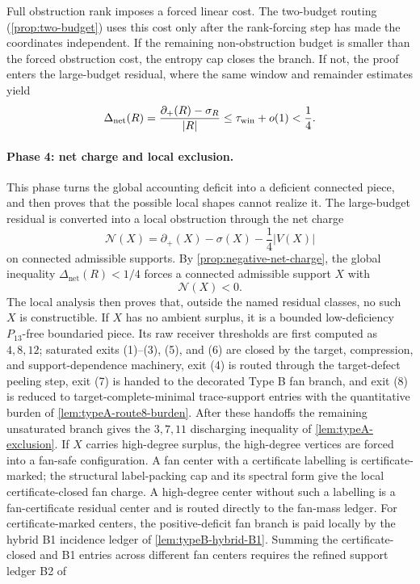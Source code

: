 \documentclass[11pt]{article}
\newcommand{\defp}{\partial_+}
\newcommand{\No}{\mathcal N}
\begin{document}
Full obstruction rank imposes a forced linear cost.  The two-budget routing
(\cref{prop:two-budget}) uses this cost only after the rank-forcing step has
made the coordinates independent.  If the remaining non-obstruction budget is
smaller than the forced obstruction cost, the entropy cap closes the branch.  If
not, the proof enters the large-budget residual, where the same window and
remainder estimates yield
\[
\Delta_{\mathrm{net}}(R)
=\frac{\defp(R)-\sigma_R}{|R|}
\le \tau_{\rm win}+o(1)<\frac14 .
\]

\paragraph{Phase 4: net charge and local exclusion.}
This phase turns the global accounting deficit into a deficient connected
piece, and then proves that the possible local shapes cannot realize it.
The large-budget residual is converted into a local obstruction through the net
charge
\[
\No(X)=\defp(X)-\sigma(X)-\frac14|V(X)|
\]
on connected admissible supports.  By
\cref{prop:negative-net-charge}, the global inequality
$\Delta_{\mathrm{net}}(R)<1/4$ forces a connected admissible support $X$ with
\[
\No(X)<0 .
\]
The local analysis then proves that, outside the named residual classes, no
such $X$ is constructible.  If $X$ has no ambient surplus, it is a bounded
low-deficiency $P_{13}$-free boundaried piece.  Its raw receiver thresholds are first
computed as $4,8,12$; saturated exits (1)--(3), (5), and (6) are closed by the
target, compression, and support-dependence machinery, exit (4) is routed through
the target-defect peeling step, exit (7) is handed to the decorated Type B fan
branch, and exit (8) is reduced to target-complete-minimal trace-support
entries with the quantitative burden of
\cref{lem:typeA-route8-burden}.  After these handoffs the remaining
unsaturated branch gives the $3,7,11$ discharging inequality of
\cref{lem:typeA-exclusion}.
If $X$ carries high-degree surplus, the high-degree vertices are forced into a
fan-safe configuration.  A fan center with a certificate labelling is
certificate-marked; the structural label-packing cap and its spectral form give
the local certificate-closed fan charge.  A high-degree center without such a
labelling is a fan-certificate residual center and is routed directly to the
fan-mass ledger.  For certificate-marked centers, the positive-deficit fan branch
is paid locally by the hybrid B1 incidence ledger of
\cref{lem:typeB-hybrid-B1}.  Summing the certificate-closed and B1 entries
across different fan centers requires the refined support ledger B2 of
\end{document}

